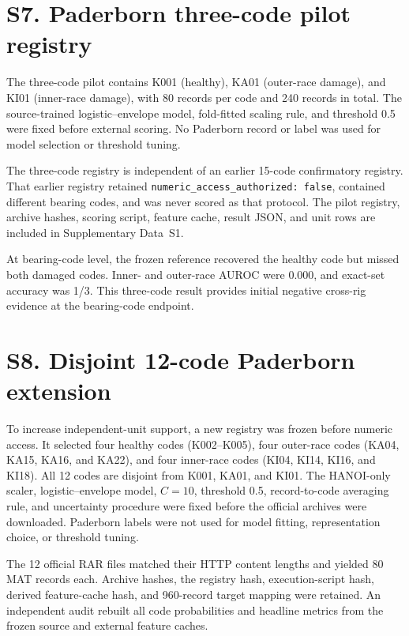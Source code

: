 \documentclass[11pt]{article}
\begin{document}
\section*{S7. Paderborn three-code pilot registry}

The three-code pilot contains K001 (healthy), KA01 (outer-race damage), and KI01 (inner-race damage), with 80 records per code and 240 records in total. The source-trained logistic--envelope model, fold-fitted scaling rule, and threshold 0.5 were fixed before external scoring. No Paderborn record or label was used for model selection or threshold tuning.

The three-code registry is independent of an earlier 15-code confirmatory registry. That earlier registry retained \texttt{numeric\_access\_authorized: false}, contained different bearing codes, and was never scored as that protocol. The pilot registry, archive hashes, scoring script, feature cache, result JSON, and unit rows are included in Supplementary Data~S1.

At bearing-code level, the frozen reference recovered the healthy code but missed both damaged codes. Inner- and outer-race AUROC were 0.000, and exact-set accuracy was 1/3. This three-code result provides initial negative cross-rig evidence at the bearing-code endpoint.

\section*{S8. Disjoint 12-code Paderborn extension}

To increase independent-unit support, a new registry was frozen before numeric access. It selected four healthy codes (K002--K005), four outer-race codes (KA04, KA15, KA16, and KA22), and four inner-race codes (KI04, KI14, KI16, and KI18). All 12 codes are disjoint from K001, KA01, and KI01. The HANOI-only scaler, logistic--envelope model, $C=10$, threshold 0.5, record-to-code averaging rule, and uncertainty procedure were fixed before the official archives were downloaded. Paderborn labels were not used for model fitting, representation choice, or threshold tuning.

The 12 official RAR files matched their HTTP content lengths and yielded 80 MAT records each. Archive hashes, the registry hash, execution-script hash, derived feature-cache hash, and 960-record target mapping were retained. An independent audit rebuilt all code probabilities and headline metrics from the frozen source and external feature caches.
\end{document}
